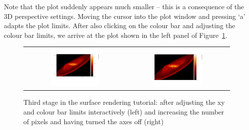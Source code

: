 \documentclass[a4paper,11pt]{article}
\begin{document}
Note that the plot suddenly appears much smaller -- this is a consequence of the 3D perspective settings. Moving the cursor into the plot window and pressing `a' adapts the plot limits. After also clicking on the colour bar and adjusting the colour bar limits, we arrive at the plot shown in the left panel of Figure~\ref{fig:surfpart3}.
\begin{figure}[h]
\begin{center}
\begin{tabular}{cc}
\includegraphics[width=0.5\textwidth]{surfpart5.png} &
\includegraphics[width=0.5\textwidth]{surfpart6.png}
\end{tabular}
\caption{Third stage in the surface rendering tutorial: after adjusting the xy and colour bar limits interactively (left) and increasing the number of pixels and having turned the axes off (right)}
\label{fig:surfpart3}
\end{center}
\end{figure}
\end{document}
